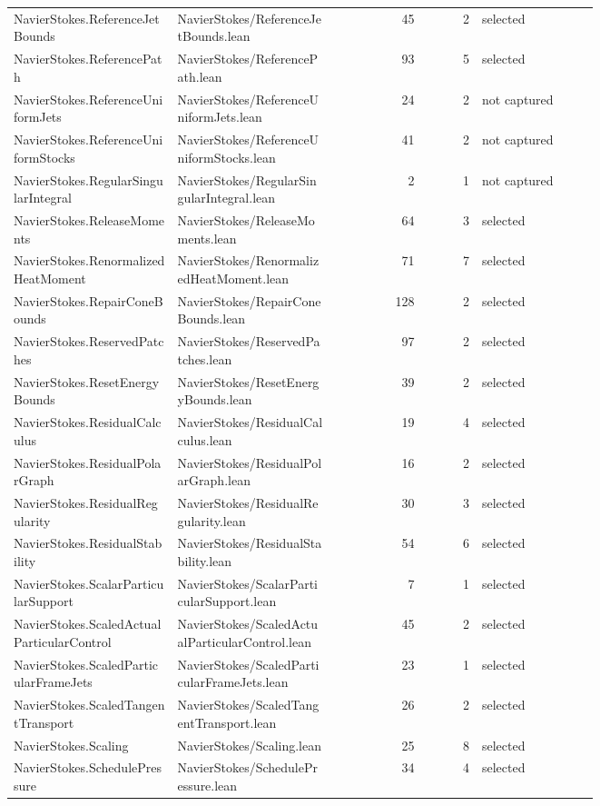 \documentclass[10pt]{article}
\begin{document}
\begin{longtable}{p{0.28\linewidth}p{0.27\linewidth}r r p{0.20\linewidth}}
NavierStokes.ReferenceJetBounds & NavierStokes/ReferenceJetBounds.lean & 45 & 2 & selected\\
NavierStokes.ReferencePath & NavierStokes/ReferencePath.lean & 93 & 5 & selected\\
NavierStokes.ReferenceUniformJets & NavierStokes/ReferenceUniformJets.lean & 24 & 2 & not captured\\
NavierStokes.ReferenceUniformStocks & NavierStokes/ReferenceUniformStocks.lean & 41 & 2 & not captured\\
NavierStokes.RegularSingularIntegral & NavierStokes/RegularSingularIntegral.lean & 2 & 1 & not captured\\
NavierStokes.ReleaseMoments & NavierStokes/ReleaseMoments.lean & 64 & 3 & selected\\
NavierStokes.RenormalizedHeatMoment & NavierStokes/RenormalizedHeatMoment.lean & 71 & 7 & selected\\
NavierStokes.RepairConeBounds & NavierStokes/RepairConeBounds.lean & 128 & 2 & selected\\
NavierStokes.ReservedPatches & NavierStokes/ReservedPatches.lean & 97 & 2 & selected\\
NavierStokes.ResetEnergyBounds & NavierStokes/ResetEnergyBounds.lean & 39 & 2 & selected\\
NavierStokes.ResidualCalculus & NavierStokes/ResidualCalculus.lean & 19 & 4 & selected\\
NavierStokes.ResidualPolarGraph & NavierStokes/ResidualPolarGraph.lean & 16 & 2 & selected\\
NavierStokes.ResidualRegularity & NavierStokes/ResidualRegularity.lean & 30 & 3 & selected\\
NavierStokes.ResidualStability & NavierStokes/ResidualStability.lean & 54 & 6 & selected\\
NavierStokes.ScalarParticularSupport & NavierStokes/ScalarParticularSupport.lean & 7 & 1 & selected\\
NavierStokes.ScaledActualParticularControl & NavierStokes/ScaledActualParticularControl.lean & 45 & 2 & selected\\
NavierStokes.ScaledParticularFrameJets & NavierStokes/ScaledParticularFrameJets.lean & 23 & 1 & selected\\
NavierStokes.ScaledTangentTransport & NavierStokes/ScaledTangentTransport.lean & 26 & 2 & selected\\
NavierStokes.Scaling & NavierStokes/Scaling.lean & 25 & 8 & selected\\
NavierStokes.SchedulePressure & NavierStokes/SchedulePressure.lean & 34 & 4 & selected\\

\end{longtable}
\end{document}
